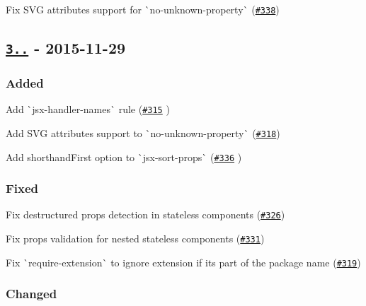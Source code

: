 \begin{DoxyItemize}
\item Fix S\+VG attributes support for \`{}no-\/unknown-\/property\`{} (\href{https://github.com/yannickcr/eslint-plugin-react/issues/338}{\tt \#338})
\end{DoxyItemize}

\subsection*{\href{https://github.com/yannickcr/eslint-plugin-react/compare/v3.10.0...v3.11.0}{\tt 3..} -\/ 2015-\/11-\/29}

\subsubsection*{Added}


\begin{DoxyItemize}
\item Add \`{}jsx-\/handler-\/names\`{} rule (\href{https://github.com/yannickcr/eslint-plugin-react/pull/315}{\tt \#315} )
\item Add S\+VG attributes support to \`{}no-\/unknown-\/property\`{} (\href{https://github.com/yannickcr/eslint-plugin-react/issues/318}{\tt \#318})
\item Add shorthand\+First option to \`{}jsx-\/sort-\/props\`{} (\href{https://github.com/yannickcr/eslint-plugin-react/pull/336}{\tt \#336} )
\end{DoxyItemize}

\subsubsection*{Fixed}


\begin{DoxyItemize}
\item Fix destructured props detection in stateless components (\href{https://github.com/yannickcr/eslint-plugin-react/issues/326}{\tt \#326})
\item Fix props validation for nested stateless components (\href{https://github.com/yannickcr/eslint-plugin-react/issues/331}{\tt \#331})
\item Fix \`{}require-\/extension\`{} to ignore extension if it\textquotesingle{}s part of the package name (\href{https://github.com/yannickcr/eslint-plugin-react/issues/319}{\tt \#319})
\end{DoxyItemize}

\subsubsection*{Changed}


